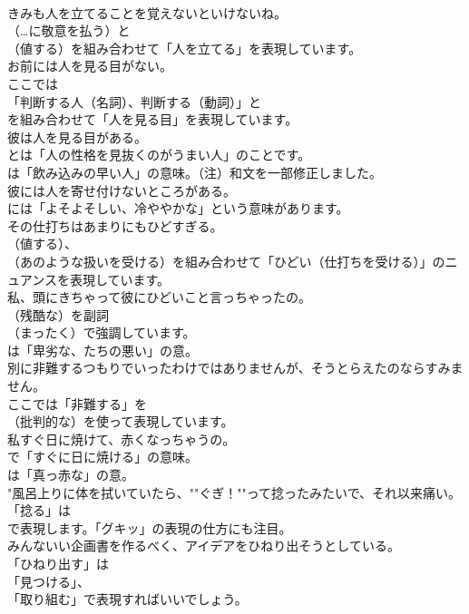 \documentclass[8pt]{extreport}
\begin{document}
\begin{CJK}{UTF8}{min}
\\	きみも人を立てることを覚えないといけないね。 
\\	（…に敬意を払う）と 
\\	（値する）を組み合わせて「人を立てる」を表現しています。	
\\	お前には人を見る目がない。 
\\	ここでは
\\	「判断する人（名詞）、判断する（動詞）」と
\\	を組み合わせて「人を見る目」を表現しています。	
\\	彼は人を見る目がある。 
\\	とは「人の性格を見抜くのがうまい人」のことです。
\\	は「飲み込みの早い人」の意味。（注）和文を一部修正しました。	
\\	彼には人を寄せ付けないところがある。 
\\	には「よそよそしい、冷ややかな」という意味があります。	
\\	その仕打ちはあまりにもひどすぎる。 
\\	（値する）、
\\	（あのような扱いを受ける）を組み合わせて「ひどい（仕打ちを受ける）」のニュアンスを表現しています。	
\\	私、頭にきちゃって彼にひどいこと言っちゃったの。 
\\	（残酷な）を副詞 
\\	（まったく）で強調しています。
\\	は「卑劣な、たちの悪い」の意。	
\\	別に非難するつもりでいったわけではありませんが、そうとらえたのならすみません。 
\\	ここでは「非難する」を 
\\	（批判的な）を使って表現しています。	
\\	私すぐ日に焼けて、赤くなっちゃうの。 
\\	で「すぐに日に焼ける」の意味。
\\	は「真っ赤な」の意。	
\\	"風呂上りに体を拭いていたら、""ぐぎ！""って捻ったみたいで、それ以来痛い。 
\\	「捻る」は 
\\	で表現します。「グキッ」の表現の仕方にも注目。
\\	みんないい企画書を作るべく、アイデアをひねり出そうとしている。 
\\	「ひねり出す」は
\\	「見つける」、
\\	「取り組む」で表現すればいいでしょう。	

\end{CJK}
\end{document}
